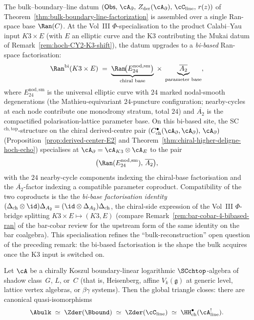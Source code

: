 \begin{remark}
\label{rem:hoch-bibased-Ran}
%
%
The bulk--boundary--line datum
$(\mathsf{Obs},\,\cA_\partial,\,Z_{\mathrm{der}}(\cA_\partial),\,
\cC_{\mathrm{line}},\,r(z))$ of
Theorem~\ref{thm:bulk-boundary-line-factorization} is assembled
over a single Ran-space base $\Ran(C)$. At the Vol~III
$\Phi$-specialisation to the product Calabi--Yau input $K3\times E$
(with $E$ an elliptic curve and the K3 contributing the Mukai datum
of Remark~\ref{rem:hoch-CY2-K3-shift}), the datum upgrades to a
\emph{bi-based} Ran-space factorisation:
\[
\Ran^{\mathrm{bi}}(K3\times E)
\;=\;
\underbrace{\Ran\!\bigl(E^{\mathrm{nod,sm}}_{24}\bigr)}_{\text{chiral
base}}
\;\times\;
\underbrace{\overline{A_2}}_{\text{parameter base}},
\]
where $E^{\mathrm{nod,sm}}_{24}$ is the universal elliptic curve with
$24$ marked nodal-smooth degenerations (the Mathieu-equivariant
$24$-puncture configuration; nearby-cycles at each node
contribute one monodromy stratum, total $24$) and $\overline{A_2}$ is
the compactified polarisation-lattice parameter base. On this
bi-based site, the SC$^{\mathrm{ch,top}}$-structure on the chiral
derived-centre pair
$(C^\bullet_{\mathrm{ch}}(\cA_\partial,\cA_\partial),\,\cA_\partial)$
(Proposition~\ref{prop:derived-center-E2} and
Theorem~\ref{thm:chiral-higher-deligne-hoch-echo}) specialises at
$\cA_\partial=\cA_{K3}\otimes\cA_E$ to the pair
\[
\bigl(\Ran(E^{\mathrm{nod,sm}}_{24}),\,\overline{A_2}\bigr),
\]
with the $24$ nearby-cycle components indexing the chiral-base
factorisation and the $\overline{A_2}$-factor indexing a compatible
parameter coproduct. Compatibility of the two coproducts is the
the \emph{bi-base factorisation identity}
$(\Delta_{\mathrm{ch}}\otimes\id)\Delta_{A_2}
 =(\id\otimes\Delta_{A_2})\Delta_{\mathrm{ch}}$,
the chiral-side expression of the Vol~III $\Phi$-bridge splitting
$K3\times E \mapsto (K3, E)$
(compare Remark~\ref{rem:bar-cobar-4-bibased-ran} of the bar-cobar
review for the upstream form of the same identity on the bar
coalgebra). This specialisation refines the ``bulk-reconstruction''
open question of the preceding remark: the bi-based factorisation is
the shape the bulk acquires once the K3 input is switched on.
\end{remark}

\begin{theorem}\label{thm:global-triangle-boundary-linear}%
%
%
Let\/ $\cA$ be a chirally Koszul boundary-linear logarithmic\/
$\SCchtop$-algebra of shadow class~$G$, $L$, or~$C$
\textup{(}that is, Heisenberg, affine\/ $V_k(\mathfrak{g})$ at
generic level, lattice vertex algebras, or\/ $\beta\gamma$
systems\textup{)}.
Then the global triangle closes: there are canonical
quasi-isomorphisms
\[
\Abulk
\;\simeq\;
\Zder(\Bbound)
\;\simeq\;
\Zder(\cC_{\mathrm{line}})
\;\simeq\;
\HH^\bullet_{\mathrm{ch}}(\cA^!_{\mathrm{line}}).
\]
\end{theorem}

